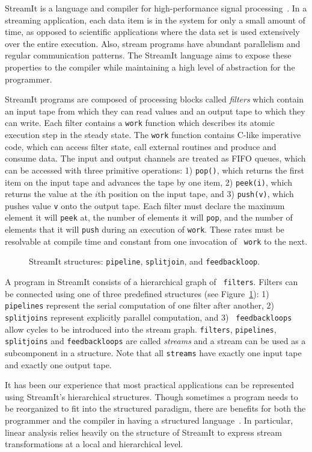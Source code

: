 StreamIt is a language and compiler for high-performance signal
processing~\cite{gordon-thesis,streamit-asplos,streamitcc}.  In a
streaming application, each data item is in the system for only a
small amount of time, as opposed to scientific applications where the
data set is used extensively over the entire execution.  Also, stream
programs have abundant parallelism and regular communication patterns.
The StreamIt language aims to expose these properties to the compiler
while maintaining a high level of abstraction for the programmer.

StreamIt programs are composed of processing blocks called {\it
filters} which contain an input tape from which they can read values
and an output tape to which they can write. Each filter contains
a {\tt work} function which describes its atomic execution step in the
steady state.  The {\tt work} function contains C-like imperative
code, which can access filter state, call external routines and
produce and consume data.  The input and output channels are treated
as FIFO queues, which can be accessed with three primitive operations:
1) {\tt pop()}, which returns the first item on the input tape and
advances the tape by one item, 2) {\tt peek(i)}, which returns the
value at the $i$th position on the input tape, and 3) {\tt push(v)},
which pushes value {\tt v} onto the output tape.  Each filter
must declare the maximum element it will {\tt peek} at, the number of
elements it will {\tt pop}, and the number of elements that it will
{\tt push} during an execution of {\tt work}.  These rates must be
resolvable at compile time and constant from one invocation of {\tt
work} to the next.  

\begin{figure}[t]
\center
\epsfxsize=3.0in
\vspace{-12pt}
\caption{StreamIt structures: {\tt pipeline}, {\tt splitjoin}, and {\tt feedbackloop}.
\protect\label{fig:structures}}
\vspace{-12pt}
\end{figure}

A program in StreamIt consists of a hierarchical graph of {\tt
filters}.  Filters can be connected using one of three predefined
structures (see Figure~\ref{fig:structures}): 1) {\tt pipelines}
represent the serial computation of one filter after another, 2) {\tt
splitjoins} represent explicitly parallel computation, and 3) {\tt
feedbackloops} allow cycles to be introduced into the stream graph.
{\tt filters}, {\tt pipelines}, {\tt splitjoins} and {\tt feedbackloops} are called
{\it streams} and a stream can be used as a subcomponent in a structure.  Note that all {\tt streams} have
exactly one input tape and exactly one output tape.

It has been our experience that most practical applications can be
represented using StreamIt's hierarchical structures.  Though
sometimes a program needs to be reorganized to fit into the structured
paradigm, there are benefits for both the programmer and the compiler
in having a structured language~\cite{streamitcc}.  In particular,
linear analysis relies heavily on the structure of StreamIt to express
stream transformations at a local and hierarchical level.

